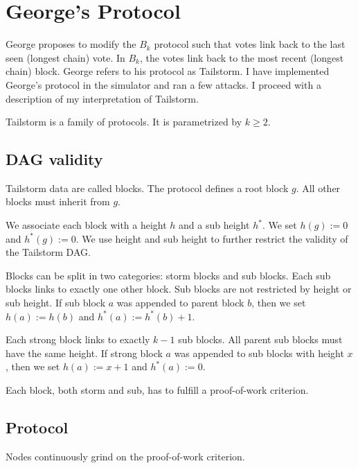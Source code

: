 \bgroup
\newcommand{\height}{h}
\newcommand{\subheight}{h^*}

\newcommand{\subparents}{\operatorname{subparents}}

\section{George's Protocol}

George proposes to modify the $B_k$ protocol such that votes link back to the last seen (longest chain) vote.
In $B_k$, the votes link back to the most recent (longest chain) block.
George refers to his protocol as Tailstorm.
I have implemented George's protocol in the simulator and ran a few attacks.
I proceed with a description of my interpretation of Tailstorm.

Tailstorm is a family of protocols.
It is parametrized by $k \geq 2$.

\subsection{DAG validity}

Tailstorm data are called blocks.
The protocol defines a root block $g$.
All other blocks must inherit from $g$.

We associate each block with a height $\height$ and a sub height $\subheight$.
We set $\height(g) := 0$ and $\subheight(g) := 0$.
We use height and sub height to further restrict the validity of the Tailstorm DAG.

Blocks can be split in two categories: storm blocks and sub blocks.
Each sub blocks links to exactly one other block.
Sub blocks are not restricted by height or sub height.
If sub block $a$ was appended to parent block $b$, then we set $\height(a) := \height(b)$ and $\subheight(a) := \subheight(b) + 1$.

Each strong block links to exactly $k-1$ sub blocks.
All parent sub blocks must have the same height.
If strong block $a$ was appended to sub blocks with height $x$, then we set $\height(a) := x + 1$ and $\subheight(a) := 0$.

Each block, both storm and sub, has to fulfill a proof-of-work criterion.

\subsection{Protocol}

Nodes continuously grind on the proof-of-work criterion.

